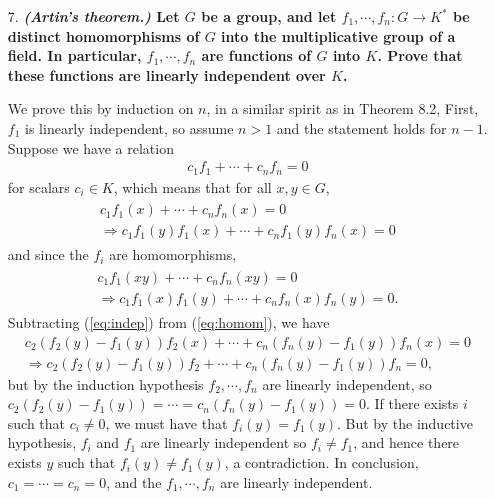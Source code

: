 \documentclass[12pt]{article}
\begin{document}
\begin{enumerate}
    \item[7.]
        \boldmath\textbf{\emph{(Artin's theorem.)} Let $G$ be a group, and let $f_1, \cdots, f_n : G \to K^*$ be distinct homomorphisms of $G$ into the multiplicative group of a field. In particular, $f_1, \cdots, f_n$ are functions of $G$ into $K$. Prove that these functions are linearly independent over $K$.
        }\unboldmath \par
        We prove this by induction on $n$, in a similar spirit as in Theorem 8.2, First, $f_1$ is linearly independent, so assume $n > 1$ and the statement holds for $n - 1$. Suppose we have a relation
        \begin{align*}
            c_1 f_1 + \cdots + c_n f_n = 0
        \end{align*}
        for scalars $c_i \in K$, which means that for all $x, y \in G$,
        \begin{gather} \label{eq:indep}
            \begin{split}
                c_1 f_1(x) + \cdots + c_n f_n(x) = 0 \\
                \Rightarrow c_1 f_1(y) f_1(x) + \cdots + c_n f_1(y) f_n(x) = 0
            \end{split}
        \end{gather}
        and since the $f_i$ are homomorphisms,
        \begin{gather} \label{eq:homom}
            \begin{split}
                c_1 f_1(xy) + \cdots + c_n f_n(xy) = 0 \\
                \Rightarrow c_1 f_1(x) f_1(y) + \cdots + c_n f_n(x) f_n(y) = 0.
            \end{split}
        \end{gather}
        Subtracting (\ref{eq:indep}) from (\ref{eq:homom}), we have
        \begin{gather*}
            c_2 (f_2(y) - f_1(y)) f_2(x) + \cdots + c_n (f_n(y) - f_1(y)) f_n(x) = 0 \\
            \Rightarrow c_2 (f_2(y) - f_1(y)) f_2 + \cdots + c_n (f_n(y) - f_1(y)) f_n = 0,
        \end{gather*}
        but by the induction hypothesis $f_2, \cdots, f_n$ are linearly independent, so $c_2(f_2(y) - f_1(y)) = \cdots = c_n(f_n(y) - f_1(y)) = 0$. If there exists $i$ such that $c_i \neq 0$, we must have that $f_i(y) = f_1(y)$. But by the inductive hypothesis, $f_i$ and $f_1$ are linearly independent so $f_i \neq f_1$, and hence there exists $y$ such that $f_i(y) \neq f_1(y)$, a contradiction. In conclusion, $c_1 = \cdots = c_n = 0$, and the $f_1, \cdots, f_n$ are linearly independent.
\end{enumerate}
\end{document}

